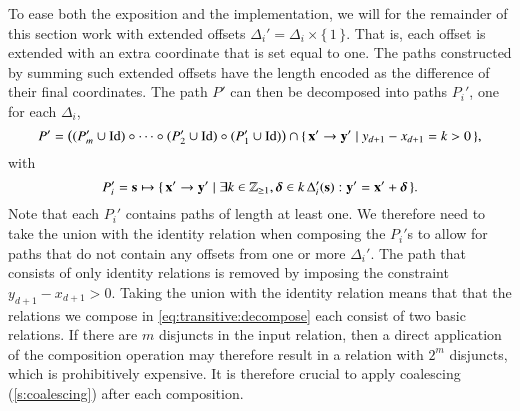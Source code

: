 To ease both the exposition and the implementation, we will for
the remainder of this section work with extended offsets
$\Delta_i' = \Delta_i \times \{\, 1 \,\}$.
That is, each offset is extended with an extra coordinate that is
set equal to one.  The paths constructed by summing such extended
offsets have the length encoded as the difference of their
final coordinates.  The path $P'$ can then be decomposed into
paths $P_i'$, one for each $\Delta_i$,
\begin{equation}
\label{eq:transitive:decompose}
P' = \left(
(P_m' \cup \identity) \circ \cdots \circ
(P_2' \cup \identity) \circ
(P_1' \cup \identity)
\right) \cap
\{\,
\vec x' \to \vec y' \mid y_{d+1} - x_{d+1} = k > 0
\,\}
,
\end{equation}
with
$$
P_i' = \vec s \mapsto \{\, \vec x' \to \vec y' \mid
\exists k \in \Z_{\ge 1}, \vec \delta \in k \, \Delta_i'(\vec s) :
\vec y' = \vec x' + \vec \delta
\,\}
.
$$
Note that each $P_i'$ contains paths of length at least one.
We therefore need to take the union with the identity relation
when composing the $P_i'$s to allow for paths that do not contain
any offsets from one or more $\Delta_i'$.
The path that consists of only identity relations is removed
by imposing the constraint $y_{d+1} - x_{d+1} > 0$.
Taking the union with the identity relation means that
that the relations we compose in \eqref{eq:transitive:decompose}
each consist of two basic relations.  If there are $m$
disjuncts in the input relation, then a direct application
of the composition operation may therefore result in a relation
with $2^m$ disjuncts, which is prohibitively expensive.
It is therefore crucial to apply coalescing (\autoref{s:coalescing})
after each composition.

